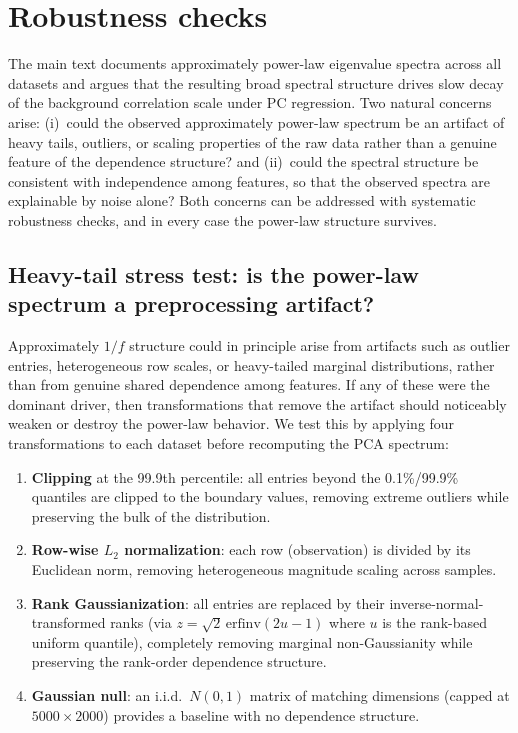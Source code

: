 \section{Robustness checks}
\label{app:robustness}

The main text documents approximately power-law eigenvalue spectra across all
datasets and argues that the resulting broad spectral structure drives slow decay
of the background correlation scale under PC regression.
Two natural concerns arise: (i)~could the observed approximately power-law spectrum be an
artifact of heavy tails, outliers, or scaling properties of the raw data rather
than a genuine feature of the dependence structure? and (ii)~could the spectral
structure be consistent with independence among features, so that the observed
spectra are explainable by noise alone?
Both concerns can be addressed with systematic robustness checks, and in every
case the power-law structure survives.

\subsection{Heavy-tail stress test: is the power-law spectrum a preprocessing artifact?}
\label{app:heavy-tail}

Approximately $1/f$ structure could in principle arise from artifacts such as
outlier entries, heterogeneous row scales, or heavy-tailed marginal distributions,
rather than from genuine shared dependence among features.
If any of these were the dominant driver, then transformations that remove the
artifact should noticeably weaken or destroy the power-law behavior.
We test this by applying four transformations to each dataset before recomputing
the PCA spectrum:

\begin{enumerate}
\item \textbf{Clipping} at the 99.9th percentile: all entries beyond the
  0.1\%/99.9\% quantiles are clipped to the boundary values,
  removing extreme outliers while preserving the bulk of the distribution.
\item \textbf{Row-wise $L_2$ normalization}: each row (observation) is divided
  by its Euclidean norm, removing heterogeneous magnitude scaling across samples.
\item \textbf{Rank Gaussianization}: all entries are replaced by their
  inverse-normal-transformed ranks (via $z = \sqrt{2}\,\mathrm{erfinv}(2u-1)$
  where $u$ is the rank-based uniform quantile), completely removing marginal
  non-Gaussianity while preserving the rank-order dependence structure.
\item \textbf{Gaussian null}: an i.i.d.\ $N(0,1)$ matrix of matching dimensions
  (capped at $5000 \times 2000$) provides a baseline with no dependence structure.
\end{enumerate}

